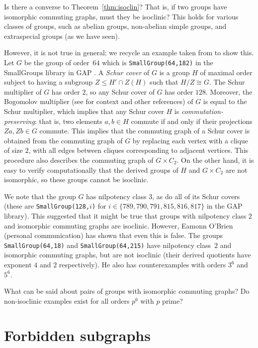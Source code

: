\documentclass{elsarticle}
\begin{document}
Is there a converse to Theorem~\ref{thm:isoclin}? That is, if two
groups have isomorphic commuting graphs, must they be isoclinic? This
holds for various classes of groups, such as abelian groups,
non-abelian simple groups, and extraspecial groups (as we have seen).

However, it is not true in general; we recycle an example taken from
\cite{CK} to show this. Let $G$ be the group of order~$64$ which is
\texttt{SmallGroup(64,182)} in the {\sc SmallGroups} library \cite{Be02} in
\textsf{GAP} \cite{gap}. A \emph{Schur cover} of $G$ is a group $H$ of maximal
order subject to having a subgroup $Z\le H'\cap Z(H)$ such that
$H/Z\cong G$.  The Schur multiplier of $G$ has order $2$, so any Schur
cover of $G$ has order $128$. Moreover, the Bogomolov multiplier (see
\cite{CK} for context and other references) of $G$ is equal to the
Schur multiplier, which implies that any Schur cover $H$ is
\emph{commutation-preserving}: that is, two elements $a,b\in H$
commute if and only if their projections $Za,Zb\in G$ commute. This
implies that the commuting graph of a Schur cover is obtained from the
commuting graph of $G$ by replacing each vertex with a clique of size
$2$, with all edges between cliques corresponding to adjacent
vertices. This procedure also describes the commuting graph of
$G\times C_2$. On the other hand, it is easy to verify computationally
that the derived groups of $H$ and $G\times C_2$ are not isomorphic,
so these groups cannot be isoclinic.

We note that the group $G$ has nilpotency class $3$, as do all of its
Schur covers (these are \texttt{SmallGroup(128,$i$)} for $i\in\{789,
790, 791, 815, 816, 817\}$ in the \textsf{GAP} library). This suggested that it
might be true that groups with nilpotency class $2$ and isomorphic commuting
graphs are isoclinic.
However, Eamonn O'Brien (personal communication) has shown that even this is
false. The groups \texttt{SmallGroup(64,18)} and \texttt{SmallGroup(64,215)}
have nilpotency class~$2$ and isomorphic commuting graphs, but are not
isoclinic (their derived quotients have exponent $4$ and $2$ respectively).
He also has counterexamples with orders $3^6$ and $5^6$.

\begin{ques}
What can be said about pairs of groups with isomorphic commuting graphs? Do
non-isoclinic examples exist for all orders $p^6$ with $p$ prime?
\end{ques}

\part{Forbidden subgraphs}
\end{document}
